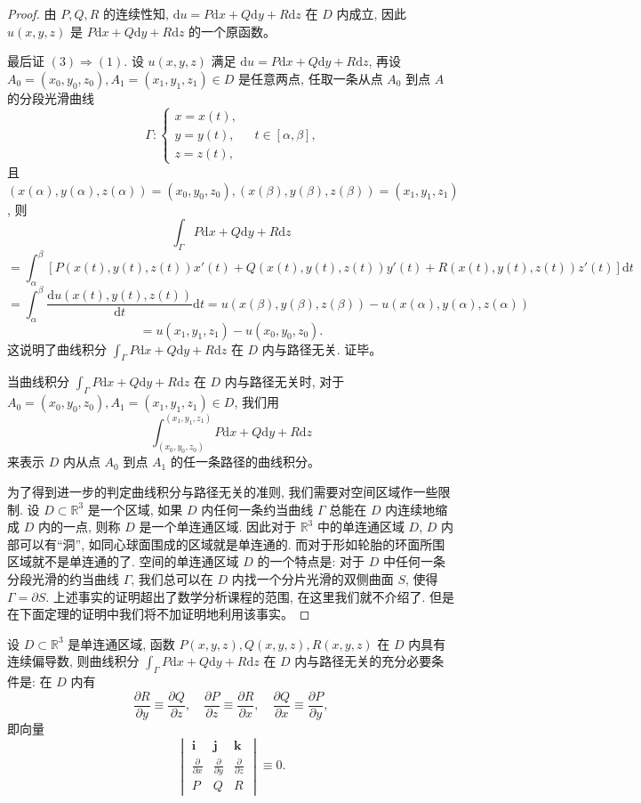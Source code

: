 \documentclass[12pt,fontset=fandol]{ctexart}
\begin{document}
\begin{proof}
由 $P,Q,R$ 的连续性知, $\mathrm du=P\mathrm dx+Q\mathrm dy+R\mathrm dz$ 在 $D$ 内成立, 因此 $u(x,y,z)$ 是 $P\mathrm dx+Q\mathrm dy+R\mathrm dz$ 的一个原函数。

最后证 $(3)\Rightarrow(1)$. 设 $u(x,y,z)$ 满足 $\mathrm du=P\mathrm dx+Q\mathrm dy+R\mathrm dz$, 再设 $A_0=(x_0,y_0,z_0),A_1=(x_1,y_1,z_1)\in D$ 是任意两点, 任取一条从点 $A_0$ 到点 $A$ 的分段光滑曲线
\[
  \Gamma:\begin{cases}
    x=x(t),\\
    y=y(t),\\
    z=z(t),
  \end{cases}\quad t\in[\alpha,\beta],
\]
且 $(x(\alpha),y(\alpha),z(\alpha))=(x_0,y_0,z_0),(x(\beta),y(\beta),z(\beta))=(x_1,y_1,z_1)$, 则
\[
  \int_\Gamma P\mathrm dx+Q\mathrm dy+R\mathrm dz
\]
\[
  =\int_\alpha^\beta
  [P(x(t),y(t),z(t))x'(t)+Q(x(t),y(t),z(t))y'(t)
  +R(x(t),y(t),z(t))z'(t)]\mathrm dt
\]
\[
  =\int_\alpha^\beta\frac{\mathrm du(x(t),y(t),z(t))}{\mathrm dt}\mathrm dt
  =u(x(\beta),y(\beta),z(\beta))-u(x(\alpha),y(\alpha),z(\alpha))
\]
\[
  =u(x_1,y_1,z_1)-u(x_0,y_0,z_0).
\]
这说明了曲线积分 $\int_\Gamma P\mathrm dx+Q\mathrm dy+R\mathrm dz$ 在 $D$ 内与路径无关. 证毕。

当曲线积分 $\int_\Gamma P\mathrm dx+Q\mathrm dy+R\mathrm dz$ 在 $D$ 内与路径无关时, 对于 $A_0=(x_0,y_0,z_0),A_1=(x_1,y_1,z_1)\in D$, 我们用
\[
  \int_{(x_0,y_0,z_0)}^{(x_1,y_1,z_1)}P\mathrm dx+Q\mathrm dy+R\mathrm dz
\]
来表示 $D$ 内从点 $A_0$ 到点 $A_1$ 的任一条路径的曲线积分。

为了得到进一步的判定曲线积分与路径无关的准则, 我们需要对空间区域作一些限制. 设 $D\subset\mathbb R^3$ 是一个区域, 如果 $D$ 内任何一条约当曲线 $\Gamma$ 总能在 $D$ 内连续地缩成 $D$ 内的一点, 则称 $D$ 是一个单连通区域. 因此对于 $\mathbb R^3$ 中的单连通区域 $D$, $D$ 内部可以有“洞”, 如同心球面围成的区域就是单连通的. 而对于形如轮胎的环面所围区域就不是单连通的了. 空间的单连通区域 $D$ 的一个特点是: 对于 $D$ 中任何一条分段光滑的约当曲线 $\Gamma$, 我们总可以在 $D$ 内找一个分片光滑的双侧曲面 $S$, 使得 $\Gamma=\partial S$. 上述事实的证明超出了数学分析课程的范围, 在这里我们就不介绍了. 但是在下面定理的证明中我们将不加证明地利用该事实。

\end{proof}
\begin{theorem}\label{course-theorem-16-7-2}\quad 设 $D\subset\mathbb R^3$ 是单连通区域, 函数 $P(x,y,z),Q(x,y,z),R(x,y,z)$ 在 $D$ 内具有连续偏导数, 则曲线积分 $\int_\Gamma P\mathrm dx+Q\mathrm dy+R\mathrm dz$ 在 $D$ 内与路径无关的充分必要条件是: 在 $D$ 内有
\[
  \frac{\partial R}{\partial y}\equiv\frac{\partial Q}{\partial z},
  \quad
  \frac{\partial P}{\partial z}\equiv\frac{\partial R}{\partial x},
  \quad
  \frac{\partial Q}{\partial x}\equiv\frac{\partial P}{\partial y},
\]
即向量
\[
  \begin{vmatrix}
    \boldsymbol i&\boldsymbol j&\boldsymbol k\\
    \frac{\partial}{\partial x}&\frac{\partial}{\partial y}&\frac{\partial}{\partial z}\\
    P&Q&R
  \end{vmatrix}
  \equiv0.
\]

\end{theorem}
\end{document}
